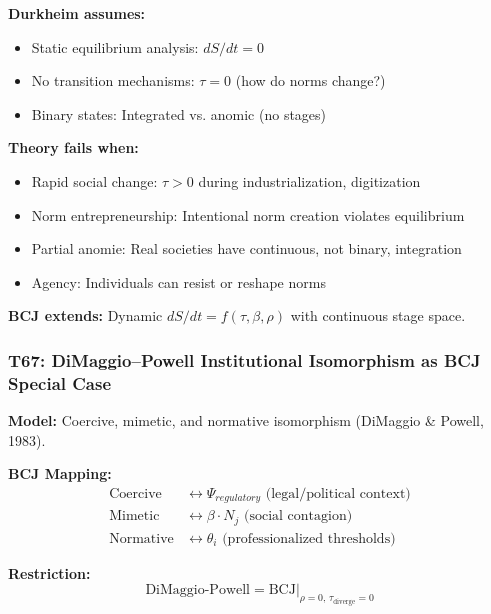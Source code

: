 \begin{tcolorbox}[colback=red!5!white, colframe=red!75!black,
    title=Boundary Condition: Where Durkheim Fails]
\textbf{Durkheim assumes:}
\begin{itemize}[nosep]
\item Static equilibrium analysis: $dS/dt = 0$
\item No transition mechanisms: $\tau = 0$ (how do norms change?)
\item Binary states: Integrated vs. anomic (no stages)
\end{itemize}

\textbf{Theory fails when:}
\begin{itemize}[nosep]
\item Rapid social change: $\tau > 0$ during industrialization, digitization
\item Norm entrepreneurship: Intentional norm creation violates equilibrium
\item Partial anomie: Real societies have continuous, not binary, integration
\item Agency: Individuals can resist or reshape norms
\end{itemize}

\textbf{BCJ extends:} Dynamic $dS/dt = f(\tau, \beta, \rho)$ with continuous stage space.
\end{tcolorbox}

\subsubsection*{T67: DiMaggio--Powell Institutional Isomorphism as BCJ Special Case}

\textbf{Model:} Coercive, mimetic, and normative isomorphism (DiMaggio \& Powell, 1983).

\textbf{BCJ Mapping:}
\begin{align}
\text{Coercive} &\leftrightarrow \Psi_{regulatory} \text{ (legal/political context)} \\
\text{Mimetic} &\leftrightarrow \beta \cdot N_j \text{ (social contagion)} \\
\text{Normative} &\leftrightarrow \theta_i \text{ (professionalized thresholds)}
\end{align}

\textbf{Restriction:}
\begin{equation}
\text{DiMaggio-Powell} = \text{BCJ} \big|_{\rho = 0, \, \tau_{\text{diverge}} = 0}
\end{equation}


